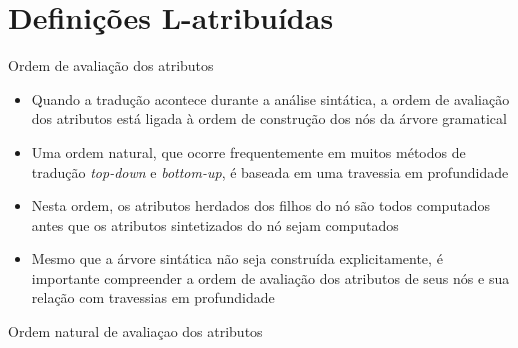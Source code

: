 \section{Definições L-atribuídas}

\begin{frame}[fragile]{Ordem de avaliação dos atributos}

    \begin{itemize}
        \item Quando a tradução acontece durante a análise sintática, a ordem de avaliação dos atributos está ligada à ordem de construção dos nós da
            árvore gramatical
        \pause

        \item Uma ordem natural, que ocorre frequentemente em muitos métodos de tradução \textit{top-down} e \textit{bottom-up}, é baseada em uma
            travessia em profundidade
        \pause

        \item Nesta ordem, os atributos herdados dos filhos do nó são todos computados antes que os atributos sintetizados do nó sejam computados
        \pause

        \item Mesmo que a árvore sintática não seja construída explicitamente, é importante compreender a ordem de avaliação dos atributos de seus nós
            e sua relação com travessias em profundidade
    \end{itemize}

\end{frame}

\begin{frame}[fragile]{Ordem natural de avaliaçao dos atributos}

    \begin{algorithmic}[i]
        \vspace{0.2in}

            \EndFor
        \EndProcedure
    \end{algorithmic}

\end{frame}

